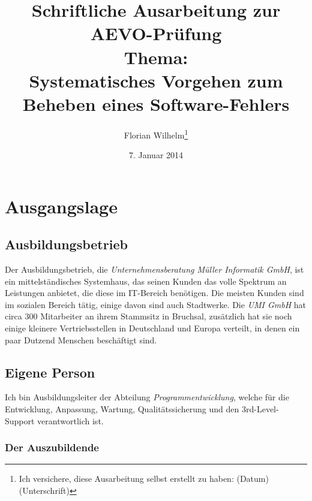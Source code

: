 \documentclass[11pt,a4paper,notitlepage,ngerman]{article}
\begin{document}
\renewcommand\footnotemark{} %
\renewcommand\footnoterule{}

\title{Schriftliche Ausarbeitung zur AEVO-Prüfung\\Thema:\\Systematisches Vorgehen zum Beheben eines Software-Fehlers}
\author{Florian Wilhelm\footnote{{\large Ich versichere, diese Ausarbeitung selbst erstellt zu haben: \underline{\hspace{3cm}} (Datum) \underline{\hspace{3cm}} (Unterschrift)  }}}
\date{7. Januar 2014}
\maketitle


\tableofcontents
\newpage

\section{Ausgangslage}

\subsection{Ausbildungsbetrieb}

Der Ausbildungsbetrieb, die \emph{Unternehmensberatung Müller Informatik GmbH},
ist ein mittelständisches Systemhaus, das seinen Kunden
das volle Spektrum an Leistungen anbietet, die diese im IT-Bereich benötigen.
Die meisten Kunden sind im sozialen Bereich tätig, einige davon sind auch
Stadtwerke. Die \emph{UMI GmbH} hat circa 300 Mitarbeiter an ihrem Stammsitz in Bruchsal,
zusätzlich hat sie noch einige kleinere Vertriebsstellen in Deutschland und Europa
verteilt, in denen ein paar Dutzend Menschen beschäftigt sind. 

\subsection{Eigene Person}

Ich bin Ausbildungsleiter der Abteilung \emph{Programmentwicklung}, welche für
die Entwicklung, Anpassung, Wartung, Qualitätssicherung und den 3rd-Level-Support
verantwortlich ist.

\subsubsection{Der Auszubildende}
\end{document}
